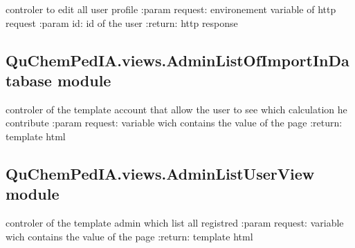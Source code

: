 \documentclass[letterpaper,10pt,english]{sphinxmanual}
\begin{document}
\begin{fulllineitems}
\label{\detokenize{QuChemPedIA.views:QuChemPedIA.views.AdminEditUserView.admin_edit_user}}
controler to edit all user profile
:param request: environement variable of http request
:param id: id of the user
:return: http response

\end{fulllineitems}



\subsection{QuChemPedIA.views.AdminListOfImportInDatabase module}
\label{\detokenize{QuChemPedIA.views:module-QuChemPedIA.views.AdminListOfImportInDatabase}}\label{\detokenize{QuChemPedIA.views:quchempedia-views-adminlistofimportindatabase-module}}

\begin{fulllineitems}
\label{\detokenize{QuChemPedIA.views:QuChemPedIA.views.AdminListOfImportInDatabase.list_of_import_in_database}}
controler of the template account that allow the user to see which calculation he contribute
:param request: variable wich contains the value of the page
:return: template html

\end{fulllineitems}



\subsection{QuChemPedIA.views.AdminListUserView module}
\label{\detokenize{QuChemPedIA.views:module-QuChemPedIA.views.AdminListUserView}}\label{\detokenize{QuChemPedIA.views:quchempedia-views-adminlistuserview-module}}

\begin{fulllineitems}
\label{\detokenize{QuChemPedIA.views:QuChemPedIA.views.AdminListUserView.list_of_all_user}}
controler of the template admin which list all registred
:param request: variable wich contains the value of the page
:return: template html

\end{fulllineitems}
\end{document}
